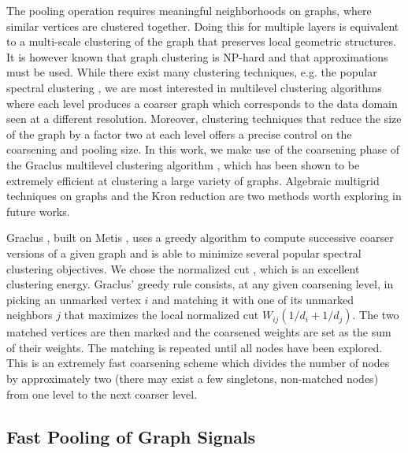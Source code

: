 \documentclass{article}
\newcommand{\todo}[1]{{\color{red} #1 }}
\begin{document}
The pooling operation requires meaningful neighborhoods on graphs, where
similar vertices are clustered together. Doing this for multiple layers is
equivalent to a multi-scale clustering of the graph that preserves local
geometric structures. It is however known that graph clustering is
\mbox{NP-hard} \cite{art:BuiJonesGraphPartNPhard} and that approximations must
be used. While there exist many clustering techniques, e.g. the popular
spectral clustering \cite{art:VonLuxburg07Tutorial}, we are most interested in
multilevel clustering algorithms where each level produces a coarser graph
which corresponds to the data domain seen at a different resolution.  Moreover,
clustering techniques that reduce the size of the graph by a factor two at each
level offers a precise control on the coarsening and pooling size.  In this
work, we make use of the coarsening phase of the Graclus multilevel clustering
algorithm \cite{art:DhillonGuanKulis07Graclus}, which has been shown to be
extremely efficient at clustering a large variety of graphs. Algebraic
multigrid techniques on graphs \cite{art:RonSafroBrandt11MultigridGraph} and
the Kron reduction \cite{art:ShumanFarajiVandergheynst16PyramTrans} are two
methods worth exploring in future works.

Graclus \cite{art:DhillonGuanKulis07Graclus}, built on Metis
\cite{art:KarypisKumar98Metis}, uses a greedy algorithm to compute successive
coarser versions of a given graph and is able to minimize several popular
spectral clustering objectives. We chose the normalized cut
\cite{art:ShiMalik00NCut}, which is an excellent clustering energy. Graclus'
greedy rule consists, at any given coarsening level, in picking an unmarked
vertex $i$ and matching it with one of its unmarked neighbors $j$ that
maximizes the local normalized cut $W_{ij} (1/d_i + 1/d_j)$.  The two matched
vertices are then marked and the coarsened weights are set as the sum of their
weights. The matching is repeated until all nodes have been explored. This is
an extremely fast coarsening scheme which divides the number of nodes by
approximately two (there may exist a few singletons, non-matched nodes) from
one level to the next coarser level.

\subsection{Fast Pooling of Graph Signals}  \label{sec:pooling}
\end{document}
